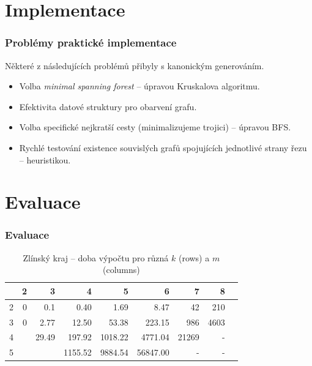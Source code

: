 \documentclass[10pt]{beamer}
\newcommand{\evenrowcolor}{\rowcolor[gray]{0.925}}
\begin{document}
\section{Implementace}

\begin{frame}
	\frametitle{Problémy praktické implementace}

	Některé z následujících problémů přibyly s kanonickým generováním.

	\begin{itemize}
		\item Volba \textit{minimal spanning forest} -- úpravou Kruskalova algoritmu.
		\item Efektivita datové struktury pro obarvení grafu.
		\item Volba specifické nejkratší cesty (minimalizujeme trojici) -- úpravou BFS.
		\item Rychlé testování existence souvislých grafů spojujících jednotlivé strany řezu -- heuristikou.
	\end{itemize}

\end{frame}

\section{Evaluace}

\begin{frame}
	\frametitle{Evaluace}

	\center

\begin{table}[H]
	\caption{Zlínský kraj -- doba výpočtu pro různá $k$ (rows) a $m$ (columns)}
	\centering
	\begin{tabular}{c|rrrrrrrr}

\toprule

	&         2 &         3 &         4 &         5 &         6 &         7 &		8 	\\ \midrule
 2	&      0 &      0.1 &      0.40 &      1.69 &      8.47 &     42 &	210	\\
\evenrowcolor
 3	&      0 &      2.77 &     12.50 &     53.38 &    223.15 &    986 &	4603	\\
 4	&           &     29.49 &    197.92 &   1018.22 &   4771.04 &  21269 &	-		\\
\evenrowcolor
 5	&           &           &   1155.52 &   9884.54 &  56847.00 &	-	   & 	-		\\

	\end{tabular}
\end{table}

\end{frame}
\end{document}
